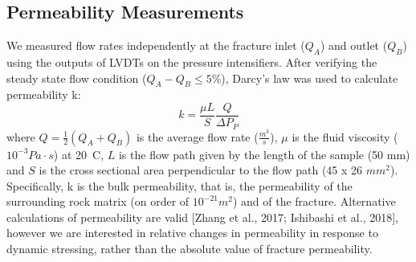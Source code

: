 \documentclass[draft]{agujournal2019}
\begin{document}
\newpage



\subsection{Permeability Measurements}
We measured flow rates independently at the fracture inlet ($Q_A$) and outlet ($Q_B$) using the outputs of LVDTs on the pressure intensifiers. After verifying the steady state flow condition ($Q_{A} - Q_{B}  \leq 5 \% $), Darcy’s law was used to calculate permeability k:
\begin{equation} \label{eq:perm}
	k = \frac{\mu L}{S} \frac{Q}{\Delta P_P}
\end{equation}
where $Q = \frac{1}{2} (Q_A + Q_B )$ is the average flow rate ($\frac{m^3}{s}$), $\mu$ is the fluid viscosity ($10^{-3} Pa\cdot s$) at 20\textdegree\ C, $L$ is the flow path given by the length of the sample (50 mm) and $S$ is the cross sectional area perpendicular to the flow path (45 x 26 $mm^2$).
Specifically, k is the bulk permeability, that is, the permeability of the surrounding rock matrix (on order of $10^{-21} m^2$) and of the fracture. Alternative calculations of permeability are valid [Zhang et al., 2017; Ishibashi et al., 2018], however we are interested in relative changes in permeability in response to dynamic stressing, rather than the absolute value of fracture permeability.
\end{document}
